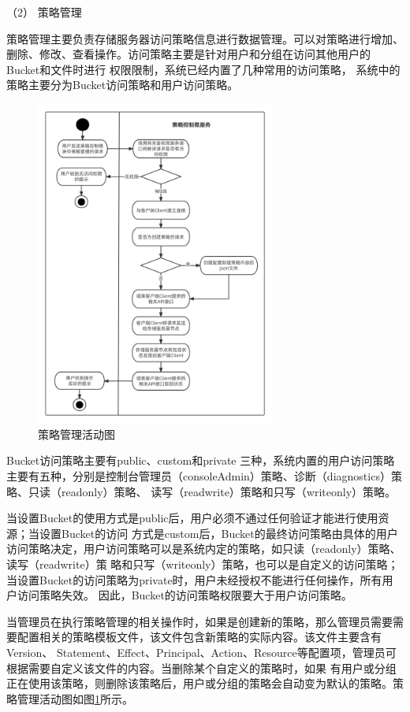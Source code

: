 （2） 策略管理

策略管理主要负责存储服务器访问策略信息进行数据管理。可以对策略进行增加、删除、修改、查看操作。访问策略主要是针对用户和分组在访问其他用户的Bucket和文件时进行
权限限制，系统已经内置了几种常用的访问策略， 系统中的策略主要分为Bucket访问策略和用户访问策略。
\begin{figure}[htb]
    \centering
    \includegraphics[width=0.7\textwidth]{my_figures/chapter4/策略管理活动图.png}
    \caption{策略管理活动图}
    \label{fig:策略管理活动图}
\end{figure} 
Bucket访问策略主要有public、custom和private
三种，系统内置的用户访问策略主要有五种，分别是控制台管理员（consoleAdmin）策略、诊断（diagnostics）策略、只读（readonly）策略、
读写（readwrite）策略和只写（writeonly）策略。

当设置Bucket的使用方式是public后，用户必须不通过任何验证才能进行使用资源；当设置Bucket的访问
方式是custom后，Bucket的最终访问策略由具体的用户访问策略决定，用户访问策略可以是系统内定的策略，如只读（readonly）策略、读写（readwrite）策
略和只写（writeonly）策略，也可以是自定义的访问策略；当设置Bucket的访问策略为private时，用户未经授权不能进行任何操作，所有用户访问策略失效。
因此，Bucket的访问策略权限要大于用户访问策略。

当管理员在执行策略管理的相关操作时，如果是创建新的策略，那么管理员需要需要配置相关的策略模板文件，该文件包含新策略的实际内容。该文件主要含有Version、
Statement、Effect、Principal、Action、Resource等配置项，管理员可根据需要自定义该文件的内容。当删除某个自定义的策略时，如果
有用户或分组正在使用该策略，则删除该策略后，用户或分组的策略会自动变为默认的策略。策略管理活动图如图\ref{fig:策略管理活动图}所示。

